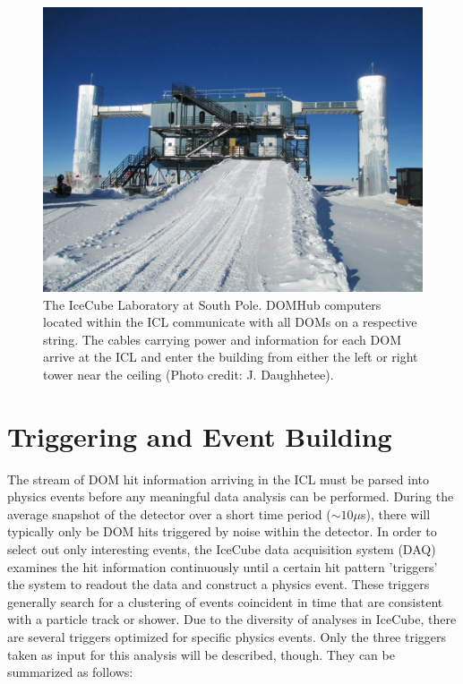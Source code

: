 \documentclass{gatech-thesis}
\begin{document}
\begin{figure}[ht]
  \begin{center}
    \includegraphics[width=1.0\textwidth,keepaspectratio]{ICL.jpg}
  \end{center}
  \caption[IceCube Laboratory Photo]{The IceCube Laboratory at South Pole. DOMHub computers located within the ICL communicate with all DOMs on a respective string. The cables carrying power and information for each DOM arrive at the ICL and enter the building from either the left or right tower near the ceiling (Photo credit: J. Daughhetee).}
  \label{fig:icl}
\end{figure}

\section{Triggering and Event Building}

The stream of DOM hit information arriving in the ICL must be parsed into physics events before any meaningful data analysis can be performed. During the average snapshot of the detector over a short time period ($\sim 10 \mu$s), there will typically only be DOM hits triggered by noise within the detector. In order to select out only interesting events, the IceCube data acquisition system (DAQ) examines the hit information continuously until a certain hit pattern 'triggers' the system to readout the data and construct a physics event. These triggers generally search for a clustering of events coincident in time that are consistent with a particle track or shower. Due to the diversity of analyses in IceCube, there are several triggers optimized for specific physics events. Only the three triggers taken as input for this analysis will be described, though. They can be summarized as follows:
\end{document}
